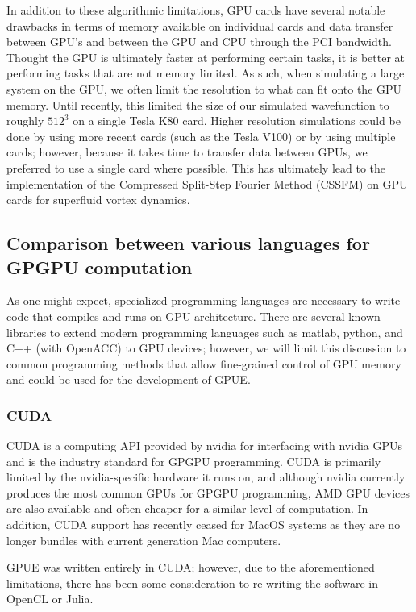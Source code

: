 In addition to these algorithmic limitations, GPU cards have several notable drawbacks in terms of memory available on individual cards and data transfer between GPU's and between the GPU and CPU through the PCI bandwidth.
Thought the GPU is ultimately faster at performing certain tasks, it is better at performing tasks that are not memory limited.
As such, when simulating a large system on the GPU, we often limit the resolution to what can fit onto the GPU memory.
Until recently, this limited the size of our simulated wavefunction to roughly $512^3$ on a single Tesla K80 card.
Higher resolution simulations could be done by using more recent cards (such as the Tesla V100) or by using multiple cards; however, because it takes time to transfer data between GPUs, we preferred to use a single card where possible.
This has ultimately lead to the implementation of the Compressed Split-Step Fourier Method (CSSFM) on GPU cards for superfluid vortex dynamics.

\subsection{Comparison between various languages for GPGPU computation}

As one might expect, specialized programming languages are necessary to write code that compiles and runs on GPU architecture.
There are several known libraries to extend modern programming languages such as matlab, python, and C++ (with OpenACC) to GPU devices; however, we will limit this discussion to common programming methods that allow fine-grained control of GPU memory and could be used for the development of GPUE.

\subsubsection{CUDA}
CUDA is a computing API provided by nvidia for interfacing with nvidia GPUs and is the industry standard for GPGPU programming.
CUDA is primarily limited by the nvidia-specific hardware it runs on, and although nvidia currently produces the most common GPUs for GPGPU programming, AMD GPU devices are also available and often cheaper for a similar level of computation.
In addition, CUDA support has recently ceased for MacOS systems as they are no longer bundles with current generation Mac computers.

GPUE was written entirely in CUDA; however, due to the aforementioned limitations, there has been some consideration to re-writing the software in OpenCL or Julia.

